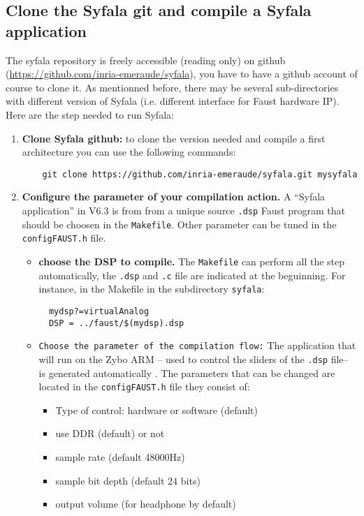 \subsection{Clone the Syfala git and compile a Syfala application}
The syfala repository is freely accessible (reading only) on  github (\url{https://github.com/inria-emeraude/syfala}), you have to have a github account of course to clone it. As mentionned before, there may be several sub-directories with different version of Syfala (i.e. different interface for Faust hardware IP). Here are the step needed to run Syfala:
\begin{enumerate}
  \item {\bf Clone Syfala github:} to clone the version needed and compile a first architecture you can use the following commands:

\begin{boxedminipage}{\textwidth}
  \begin{verbatim}
    git clone https://github.com/inria-emeraude/syfala.git mysyfala
\end{verbatim}
\end{boxedminipage}


\item {\bf Configure the parameter of your compilation action.}
  A ``Syfala application'' in V6.3 is from from a unique source {\tt .dsp} Faust program that should be choosen in the {\tt Makefile}. Other parameter can be tuned in the {\tt configFAUST.h} file.

  \begin{itemize}
  \item {\bf choose the DSP to compile.} The {\tt Makefile} can perform all the step automatically, the {\tt .dsp} and {\tt .c} file are indicated at the beguinning. For instance, in the Makefile in the subdirectory {\tt syfala}:\\
    \begin{boxedminipage}{\textwidth}
\begin{verbatim}
  mydsp?=virtualAnalog
  DSP = ../faust/$(mydsp).dsp
\end{verbatim}
    \end{boxedminipage}
    \item {\tt Choose the parameter of the compilation flow:} The application that will run on the Zybo ARM --  used to control the sliders of the {\tt .dsp} file-- is generated automatically . The parameters that can be changed are located in the {\tt configFAUST.h} file they consist of:
\begin{itemize}
\item Type of control: hardware or software (default)
\item use DDR (default) or not
\item sample rate (default 48000Hz)
\item sample bit depth (default 24 bits)
\item output volume (for headphone by default)
\end{itemize}


\end{itemize}
\end{enumerate}
